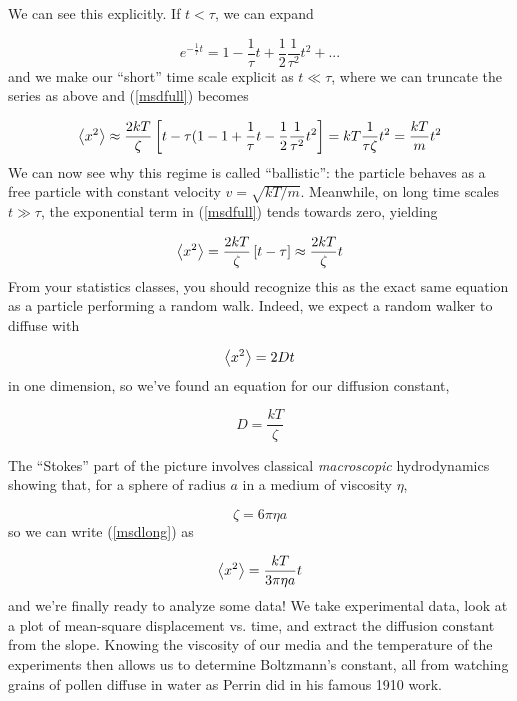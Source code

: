 \documentclass[12pt]{article}
\begin{document}
We can see this explicitly. If $t < \tau$, we can expand

\begin{equation}
  e^{-\frac{1}{\tau} t} = 1 - \frac{1}{\tau} t + \frac{1}{2}\frac{1}{\tau^2}t^2 + ...
\end{equation}
and we make our ``short'' time scale explicit as $t \ll \tau$, where
we can truncate the series as above and (\ref{msdfull}) becomes

\begin{equation}
  \label{msdshort}
  \left< x^2\right> \approx
  \frac{2kT}{\zeta}\left[t-\tau(1- 1 + \frac{1}{\tau} t - \frac{1}{2}\frac{1}{\tau^2}t^2 \right] 
  = kT\frac{1}{\tau\zeta} t^2 = \frac{kT}{m}t^2
\end{equation}
We can now see why this regime is called ``ballistic'': the particle
behaves as a free particle with constant velocity
$v=\sqrt{kT/m}$. Meanwhile, on long time scales $t \gg \tau$,
the exponential term in (\ref{msdfull}) tends towards zero, yielding 


\begin{equation}
  \label{msdlong}
  \left< x^2\right> = \frac{2kT}{\zeta}\left[t-\tau \right] 
  \approx \frac{2kT}{\zeta}t
\end{equation}
From your statistics classes, you should recognize this as the exact
same equation as a particle performing a random walk. Indeed, we
expect a random walker to diffuse with


\begin{equation}
  \left< x^2\right> = 2Dt
\end{equation}
in one dimension, so we've found an equation for our diffusion
constant,

\begin{equation}
  D = \frac{kT}{\zeta}
\end{equation}

The ``Stokes'' part of the picture involves classical
\textit{macroscopic} hydrodynamics showing that, for a sphere of
radius $a$ in a medium of viscosity $\eta$,

\begin{equation}
  \zeta  = 6\pi\eta a
\end{equation}
so we can write (\ref{msdlong}) as

\begin{equation}
  \left< x^2\right> = \frac{kT}{3\pi\eta a} t
\end{equation}
and we're finally ready to analyze some data! We take experimental
data, look at a plot of mean-square displacement vs. time, and extract
the diffusion constant from the slope. Knowing the viscosity of our
media and the temperature of the experiments then allows us to
determine Boltzmann's constant, all from watching grains of pollen
diffuse in water as Perrin did in his famous 1910 work.
\end{document}
